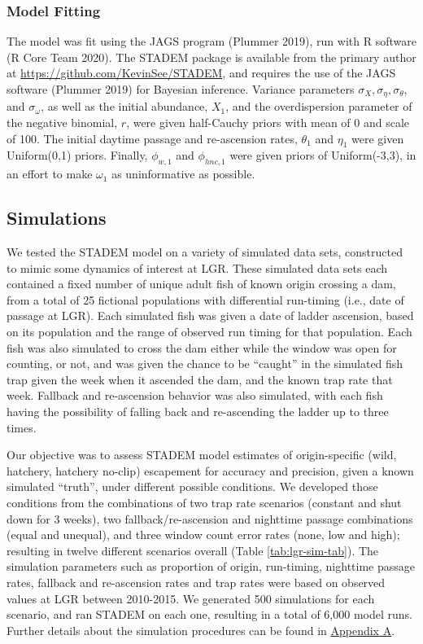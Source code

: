 \documentclass[
  12pt,
]{article}
\begin{document}
\hypertarget{model-fitting}{%
\subsubsection{Model Fitting}\label{model-fitting}}

The model was fit using the JAGS program (Plummer 2019), run with R software (R Core Team 2020). The STADEM package is available from the primary author at \url{https://github.com/KevinSee/STADEM}, and requires the use of the JAGS software (Plummer 2019) for Bayesian inference. Variance parameters \(\sigma_X, \sigma_\eta, \sigma_\theta\), and \(\sigma_\omega\), as well as the initial abundance, \(X_1\), and the overdispersion parameter of the negative binomial, \(r\), were given half-Cauchy priors with mean of 0 and scale of 100. The initial daytime passage and re-ascension rates, \(\theta_1\) and \(\eta_1\) were given Uniform(0,1) priors. Finally, \(\phi_{w,1}\) and \(\phi_{hnc,1}\) were given priors of Uniform(-3,3), in an effort to make \(\omega_1\) as uninformative as possible.

\hypertarget{simulations}{%
\subsection{Simulations}\label{simulations}}

We tested the STADEM model on a variety of simulated data sets, constructed to mimic some dynamics of interest at LGR. These simulated data sets each contained a fixed number of unique adult fish of known origin crossing a dam, from a total of 25 fictional populations with differential run-timing (i.e., date of passage at LGR). Each simulated fish was given a date of ladder ascension, based on its population and the range of observed run timing for that population. Each fish was also simulated to cross the dam either while the window was open for counting, or not, and was given the chance to be ``caught'' in the simulated fish trap given the week when it ascended the dam, and the known trap rate that week. Fallback and re-ascension behavior was also simulated, with each fish having the possibility of falling back and re-ascending the ladder up to three times.

Our objective was to assess STADEM model estimates of origin-specific (wild, hatchery, hatchery no-clip) escapement for accuracy and precision, given a known simulated ``truth'', under different possible conditions. We developed those conditions from the combinations of two trap rate scenarios (constant and shut down for 3 weeks), two fallback/re-ascension and nighttime passage combinations (equal and unequal), and three window count error rates (none, low and high); resulting in twelve different scenarios overall (Table \ref{tab:lgr-sim-tab}). The simulation parameters such as proportion of origin, run-timing, nighttime passage rates, fallback and re-ascension rates and trap rates were based on observed values at LGR between 2010-2015. We generated 500 simulations for each scenario, and ran STADEM on each one, resulting in a total of 6,000 model runs. Further details about the simulation procedures can be found in \protect\hyperlink{append1}{Appendix A}.
\end{document}
